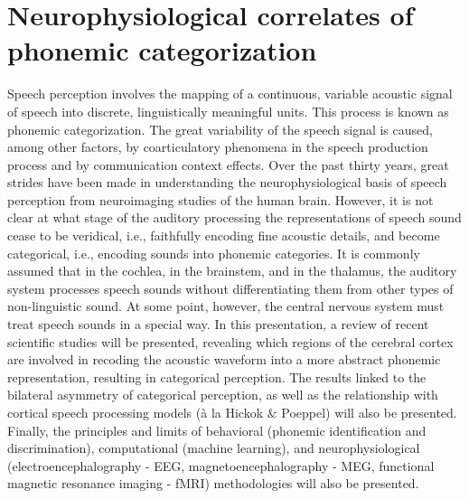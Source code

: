 \chapter{Neurophysiological correlates of phonemic categorization}\label{ch:rafael}
\begin{affils}
\end{affils}

\noindent
Speech perception involves the mapping of a continuous, variable acoustic signal of speech into discrete, linguistically meaningful units. This process is known as phonemic categorization. The great variability of the speech signal is caused, among other factors, by coarticulatory phenomena in the speech production process and by communication context effects. Over the past thirty years, great strides have been made in understanding the neurophysiological basis of speech perception from neuroimaging studies of the human brain.  However, it is not clear at what stage of the auditory processing the representations of speech sound cease to be veridical, i.e., faithfully encoding fine acoustic details, and become categorical, i.e., encoding sounds into phonemic categories. It is commonly assumed that in the cochlea, in the brainstem, and in the thalamus, the auditory system processes speech sounds without differentiating them from other types of non-linguistic sound. At some point, however, the central nervous system must treat speech sounds in a special way. In this presentation, a review of recent scientific studies will be presented, revealing which regions of the cerebral cortex are involved in recoding the acoustic waveform into a more abstract phonemic representation, resulting in categorical perception. The results linked to the bilateral asymmetry of categorical perception, as well as the relationship with cortical speech processing models (à la Hickok \& Poeppel) will also be presented. Finally, the principles and limits of behavioral (phonemic identification and discrimination), computational (machine learning), and neurophysiological (electroencephalography - EEG, magnetoencephalography - MEG, functional magnetic resonance imaging - fMRI) methodologies will also be presented.

